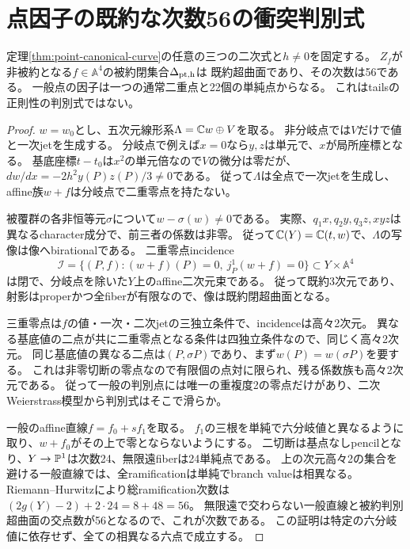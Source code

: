 \section{点因子の既約な次数56の衝突判別式}
\begin{theorem}[六分岐値全体での衝突判別式]
\label{thm:point-discriminant-56}
定理\ref{thm:point-canonical-curve}の任意の三つの二次式と$h\ne0$を固定する。
$Z_f$が非被約となる$f\in\mathbb A^4$の被約閉集合$\Delta_{\rm pt,h}$は
既約超曲面であり、その次数は56である。
一般点の因子は一つの通常二重点と22個の単純点からなる。
これはtailsの正則性の判別式ではない。
\end{theorem}
\begin{proof}
$w=w_0$とし、五次元線形系$\Lambda=\mathbb C w\oplus V$を取る。
非分岐点では$V$だけで値と一次jetを生成する。
分岐点で例えば$x=0$なら$y,z$は単元で、$x$が局所座標となる。
基底座標$t-t_0$は$x^2$の単元倍なので$V$の微分は零だが、
$dw/dx=-2h^2y(P)z(P)/3\ne0$である。
従って$\Lambda$は全点で一次jetを生成し、affine族$w+f$は分岐点で二重零点を持たない。

被覆群の各非恒等元$\sigma$について$w-\sigma(w)\ne0$である。
実際、$q_1x,q_2y,q_3z,xyz$は異なるcharacter成分で、前三者の係数は非零。
従って$\mathbb C(Y)=\mathbb C(t,w)$で、$\Lambda$の写像は像へbirationalである。
二重零点incidence
\[
 \mathcal I=\{(P,f):(w+f)(P)=0,\ j^1_P(w+f)=0\}\subset Y\times\mathbb A^4
\]
は閉で、分岐点を除いた$Y$上のaffine二次元束である。
従って既約3次元であり、射影はproperかつ全fiberが有限なので、像は既約閉超曲面となる。

三重零点は$f$の値・一次・二次jetの三独立条件で、incidenceは高々2次元。
異なる基底値の二点が共に二重零点となる条件は四独立条件なので、同じく高々2次元。
同じ基底値の異なる二点は$(P,\sigma P)$であり、まず$w(P)=w(\sigma P)$を要する。
これは非零切断の零点なので有限個の点対に限られ、残る係数族も高々2次元である。
従って一般の判別点には唯一の重複度2の零点だけがあり、二次Weierstrass模型から判別式はそこで滑らか。

一般のaffine直線$f=f_0+sf_1$を取る。
$f_1$の三根を単純で六分岐値と異なるように取り、$w+f_0$がその上で零とならないようにする。
二切断は基点なしpencilとなり、$Y\to\mathbb P^1$は次数24、無限遠fiberは24単純点である。
上の次元高々2の集合を避ける一般直線では、全ramificationは単純でbranch valueは相異なる。
Riemann--Hurwitzにより総ramification次数は
$(2g(Y)-2)+2\cdot24=8+48=56$。
無限遠で交わらない一般直線と被約判別超曲面の交点数が56となるので、これが次数である。
この証明は特定の六分岐値に依存せず、全ての相異なる六点で成立する。
\end{proof}
